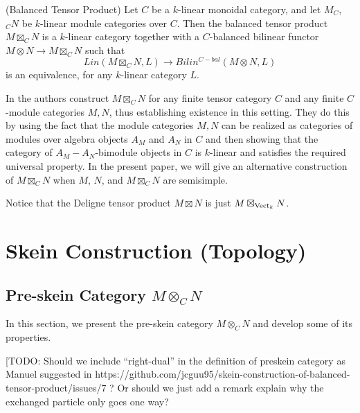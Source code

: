 \begin{definition}\label{definition/balanced-tensor-product} (Balanced Tensor Product)
  \noindent Let $C$ be a $k$-linear monoidal category, and let $M_C$, $_{C}N$
  be $k$-linear module categories over $C$. \quad Then the balanced tensor
  product $M \boxtimes_{C} N$ is a $k$-linear category together with a
  $C$-balanced bilinear functor $M\otimes N\to M\boxtimes_{C} N$ such
  that \[Lin(M \boxtimes_{C} N, L) \to Bilin^{C-bal}(M \otimes N, L)\] is an
  equivalence, for any $k$-linear category $L$.
\end{definition}

In \cite{douglas/balanced-product} the authors construct $M\boxtimes_C N$ for
any finite tensor category $C$ and any finite $C$-module categories $M, N$,
thus establishing existence in this setting. They do this by using the fact
that the module categories $M,N$ can be realized as categories of modules over
algebra objects $A_M$ and $A_N$ in $C$ and then showing that the category of
$A_M-A_N$-bimodule objects in $C$ is $k$-linear and satisfies the required
universal property. In the present paper, we will give an alternative
construction of $M\boxtimes_C N$ when $M$, $N$, and $M \boxtimes_{C} N$ are
semisimple.

\begin{remark} \label{remark/deligne-tensor-product}
  Notice that the Deligne tensor product $M \boxtimes N$ is just
  $M \boxtimes_{\operatorname{Vect}_k} N$.
\end{remark}

\section{Skein Construction (Topology)}\label{section/skein-construction}

\subsection{Pre-skein Category $M\otimes_C N$}

\noindent In this section, we present the pre-skein category $M \otimes_{C} N$
and develop some of its properties.

[TODO: Should we include ``right-dual'' in the definition of preskein category
as Manuel suggested in
https://github.com/jcguu95/skein-construction-of-balanced-tensor-product/issues/7
? Or should we just add a remark explain why the exchanged particle only goes
one way?


